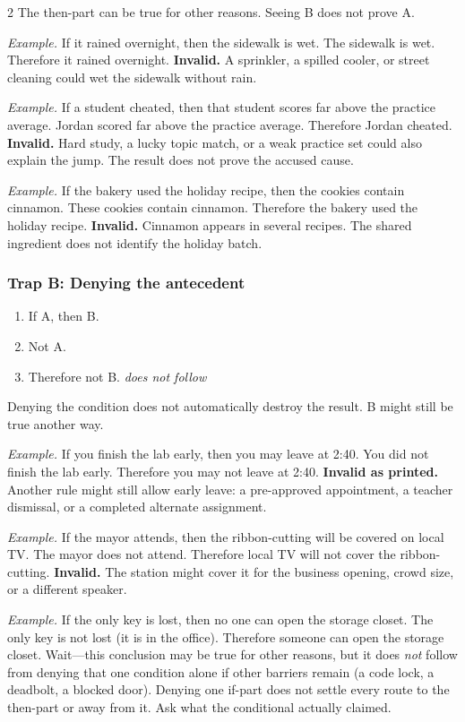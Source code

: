 \documentclass[12pt]{article}
\newcommand{\exbox}[1]{\par\vspace{0.2em}\noindent\textit{Example.} #1\par\vspace{0.15em}}
\begin{document}
\begin{multicols}{2}
The then-part can be true for other reasons. Seeing B does not prove A.

\exbox{If it rained overnight, then the sidewalk is wet. The sidewalk is wet. Therefore it rained overnight. \textbf{Invalid.} A sprinkler, a spilled cooler, or street cleaning could wet the sidewalk without rain.}

\exbox{If a student cheated, then that student scores far above the practice average. Jordan scored far above the practice average. Therefore Jordan cheated. \textbf{Invalid.} Hard study, a lucky topic match, or a weak practice set could also explain the jump. The result does not prove the accused cause.}

\exbox{If the bakery used the holiday recipe, then the cookies contain cinnamon. These cookies contain cinnamon. Therefore the bakery used the holiday recipe. \textbf{Invalid.} Cinnamon appears in several recipes. The shared ingredient does not identify the holiday batch.}

\subsubsection*{Trap B: Denying the antecedent}
\begin{enumerate}[leftmargin=*,itemsep=0.08em]
\item If A, then B.
\item Not A.
\item Therefore not B. \quad\textit{does not follow}
\end{enumerate}

Denying the condition does not automatically destroy the result. B might still be true another way.

\exbox{If you finish the lab early, then you may leave at 2:40. You did not finish the lab early. Therefore you may not leave at 2:40. \textbf{Invalid as printed.} Another rule might still allow early leave: a pre-approved appointment, a teacher dismissal, or a completed alternate assignment.}

\exbox{If the mayor attends, then the ribbon-cutting will be covered on local TV. The mayor does not attend. Therefore local TV will not cover the ribbon-cutting. \textbf{Invalid.} The station might cover it for the business opening, crowd size, or a different speaker.}

\exbox{If the only key is lost, then no one can open the storage closet. The only key is not lost (it is in the office). Therefore someone can open the storage closet. Wait---this conclusion may be true for other reasons, but it does \textit{not} follow from denying that one condition alone if other barriers remain (a code lock, a deadbolt, a blocked door). Denying one if-part does not settle every route to the then-part or away from it. Ask what the conditional actually claimed.}


\end{multicols}
\end{document}
